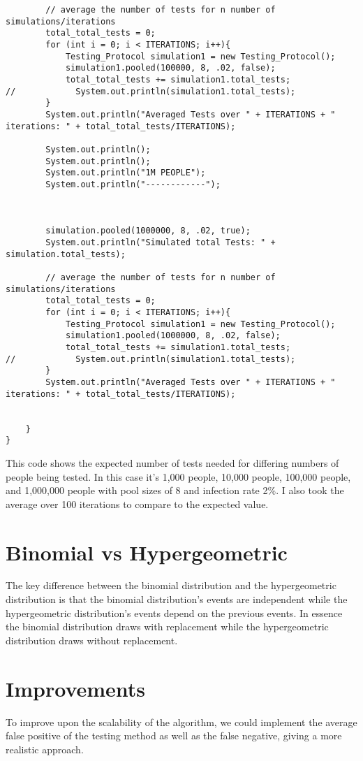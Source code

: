 \documentclass{article}
\begin{document}
\begin{lstlisting}
        // average the number of tests for n number of simulations/iterations
        total_total_tests = 0;
        for (int i = 0; i < ITERATIONS; i++){
            Testing_Protocol simulation1 = new Testing_Protocol();
            simulation1.pooled(100000, 8, .02, false);
            total_total_tests += simulation1.total_tests;
//            System.out.println(simulation1.total_tests);
        }
        System.out.println("Averaged Tests over " + ITERATIONS + " iterations: " + total_total_tests/ITERATIONS);

        System.out.println();
        System.out.println();
        System.out.println("1M PEOPLE");
        System.out.println("------------");



        simulation.pooled(1000000, 8, .02, true);
        System.out.println("Simulated total Tests: " + simulation.total_tests);

        // average the number of tests for n number of simulations/iterations
        total_total_tests = 0;
        for (int i = 0; i < ITERATIONS; i++){
            Testing_Protocol simulation1 = new Testing_Protocol();
            simulation1.pooled(1000000, 8, .02, false);
            total_total_tests += simulation1.total_tests;
//            System.out.println(simulation1.total_tests);
        }
        System.out.println("Averaged Tests over " + ITERATIONS + " iterations: " + total_total_tests/ITERATIONS);


    }
}

\end{lstlisting}
This code shows the expected number of tests needed for differing numbers of people being tested.  In this case it's 1,000 people, 10,000 people, 100,000 people, and 1,000,000 people with pool sizes of 8 and infection rate 2\%.  I also took the average over 100 iterations to compare to the expected value.


\section{Binomial vs Hypergeometric}
The key difference between the binomial distribution and the hypergeometric distribution is that the binomial distribution's events are independent while the hypergeometric distribution's events depend on the previous events. In essence the binomial distribution draws with replacement while the hypergeometric distribution draws without replacement.

\section{Improvements}
To improve upon the scalability of the algorithm, we could implement the average false positive of the testing method as well as the false negative, giving a more realistic approach.
\end{document}
